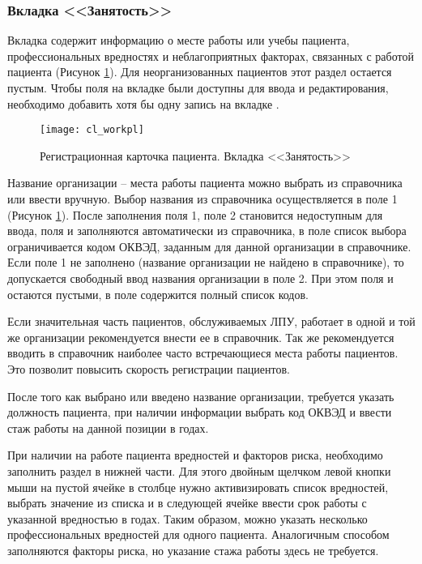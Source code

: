 \subsubsection{Вкладка <<Занятость>>}

Вкладка  содержит информацию о месте работы или учебы пациента, профессиональных вредностях и неблагоприятных факторах, связанных с работой пациента (Рисунок \ref{img_cl_workpl}). Для неорганизованных пациентов этот раздел остается пустым. Чтобы поля на вкладке  были доступны для ввода и редактирования, необходимо добавить хотя бы одну запись на вкладке .

\begin{figure}[ht]\centering
 \texttt{[image: cl\_workpl]}
 \caption{Регистрационная карточка пациента. Вкладка <<Занятость>>}
 \label{img_cl_workpl}
\end{figure} 

Название организации – места работы пациента можно выбрать из справочника или ввести вручную. Выбор названия из справочника осуществляется в поле 1 (Рисунок \ref{img_cl_workpl}). После заполнения поля 1, поле 2 становится недоступным для ввода, поля  и  заполняются автоматически из справочника, в поле  список выбора ограничивается кодом ОКВЭД, заданным для данной организации в справочнике. Если поле 1 не заполнено (название организации не найдено в справочнике), то допускается свободный ввод названия организации в поле 2. При этом поля  и  остаются пустыми, в поле  содержится полный список кодов.

\begin{prim}
Если значительная часть пациентов, обслуживаемых ЛПУ, работает в одной и той же организации рекомендуется внести ее в справочник. Так же рекомендуется вводить в справочник наиболее часто встречающиеся места работы пациентов. Это позволит повысить скорость регистрации пациентов.
\end{prim}
 
После того как выбрано или введено название организации, требуется указать должность пациента, при наличии информации выбрать код ОКВЭД и ввести стаж работы на данной позиции в годах. 

При наличии на работе пациента вредностей и факторов риска, необходимо заполнить раздел  в нижней части. Для этого двойным щелчком левой кнопки мыши на пустой ячейке в столбце  нужно активизировать список вредностей, выбрать значение из списка и в следующей ячейке ввести срок работы с указанной вредностью в годах. Таким образом, можно указать несколько профессиональных вредностей для одного пациента. Аналогичным способом заполняются факторы риска, но указание стажа работы здесь не требуется.

